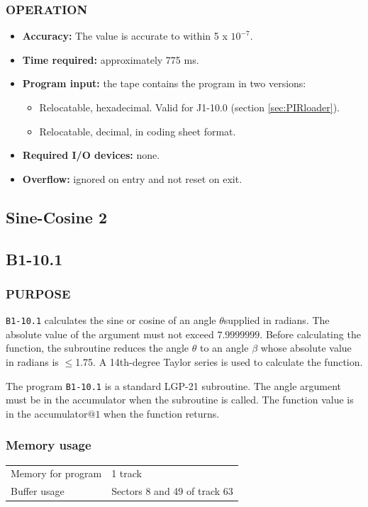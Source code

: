 \documentclass{article}
\begin{document}
\subsubsection*{OPERATION}
\begin{itemize}
    \item \textbf{Accuracy:} The value is accurate to within 5 x $10^{-7}$.
    \item \textbf{Time required:} approximately 775 ms.
    \item \textbf{Program input:} the tape contains the program in two versions: %
    \begin{itemize}
      \item Relocatable, hexadecimal. Valid for J1-10.0 (section \ref{sec:PIRloader}).
        \item Relocatable, decimal, in coding sheet format.
    \end{itemize}
    \item \textbf{Required I/O devices:} none.
    \item \textbf{Overflow:} ignored on entry and not reset on exit.
\end{itemize}

\newpage

\subsection{Sine-Cosine 2}
\label{sec:sine_cosine_2}

\subsection*{B1-10.1}

\subsubsection*{PURPOSE}
\texttt{B1-10.1} calculates the sine or cosine of an angle $\theta$supplied in radians. The absolute value of the argument must not exceed $7.9999999$. Before calculating the function, the subroutine reduces the angle $\theta$ to an angle $\beta$ whose absolute value in radians is $\le$1.75. A 14th-degree Taylor series is used to calculate the function.

The program \texttt{B1-10.1} is a standard LGP-21 subroutine. The angle argument must be in the accumulator when the subroutine is called. The function value is in the accumulator$@1$ when the function returns.

\subsubsection*{Memory usage}
\begin{center}
\begin{tabular}{ll}
    \toprule
    Memory for program & 1 track \\
    Buffer usage & Sectors 8 and 49 of track 63 \\
    \bottomrule
\end{tabular}
\end{center}
\end{document}
